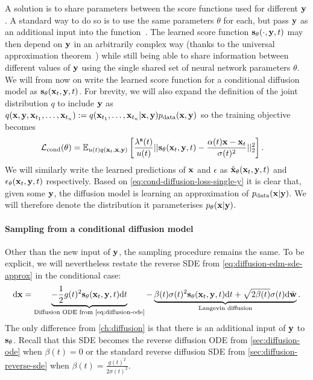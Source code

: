 A solution is to share parameters between the score functions used for different ${\mathbf{y}}$. A standard way to do so is to use the same parameters $\theta$ for each, but pass ${\mathbf{y}}$ as an additional input into the function~\citep{sohn2015learning}. The learned score function ${\mathbf{s}}_\theta(\cdot, {\mathbf{y}}, t)$ may then depend on ${\mathbf{y}}$ in an arbitrarily complex way (thanks to the universal approximation theorem~\citep{hornik1989multilayer}) while still being able to share information between different values of ${\mathbf{y}}$ using the single shared set of neural network parameters $\theta$. We will from now on write the learned score function for a conditional diffusion model as ${\mathbf{s}}_\theta({\mathbf{x}}_t, {\mathbf{y}}, t)$. For brevity, we will also expand the definition of the joint distribution $q$ to include ${\mathbf{y}}$ as $q({\mathbf{x}},{\mathbf{y}},{\mathbf{x}}_{t_1},\ldots,{\mathbf{x}}_{t_n}) := q({\mathbf{x}}_{t_1},\ldots,{\mathbf{x}}_{t_n}|{\mathbf{x}},{\mathbf{y}})p_{\rm{data}}({\mathbf{x}},{\mathbf{y}})$ so the training objective becomes
\begin{align} \label{eq:cond-diffusion-loss}
    {\mathcal{L}}_\text{cond}(\theta) &= \mathbb{E}_{u(t)q({\mathbf{x}}_t, {\mathbf{x}}, {\mathbf{y}})} \left[ \frac{\lambda^{\mathbf{s}}(t)}{u(t)} 
    || {\mathbf{s}}_{\theta}({\mathbf{x}}_t, {\mathbf{y}}, t) - \frac{\alpha(t){\mathbf{x}}-{\mathbf{x}}_t}{\sigma(t)^2} ||_2^2 \right].
\end{align}
We will similarly write the learned predictions of ${\mathbf{x}}$ and $\epsilon$ as $\hat{{\mathbf{x}}}_{\theta}({\mathbf{x}}_t, {\mathbf{y}}, t)$ and $\mathbf{\epsilon}_{\theta}({\mathbf{x}}_t, {\mathbf{y}}, t)$ respectively.
Based on \cref{eq:cond-diffusion-loss-single-y} it is clear that, given some ${\mathbf{y}}$, the diffusion model is learning an approximation of $p_{\rm{data}}({\mathbf{x}}|{\mathbf{y}})$. We will therefore denote the distribution it parameterises $p_\theta({\mathbf{x}}|{\mathbf{y}})$.

\paragraph{Sampling from a conditional diffusion model}
Other than the new input of ${\mathbf{y}}$, the sampling procedure remains the same. To be explicit, we will nevertheless restate the reverse SDE from \cref{eq:diffusion-edm-sde-approx} in the conditional case:
\begin{align}
    \mathrm{d}\rvx = \underbrace{- \frac{1}{2} g(t)^2 \rvs_\theta(\rvx_t, \rvy, t) \mathrm{d}t}_\text{Diffusion ODE from \cref{eq:diffusion-ode}} - \underbrace{\beta(t) \sigma(t)^2 \rvs_\theta(\rvx_t, \rvy, t) \mathrm{d}t + \sqrt{2\beta(t)}\sigma(t)\mathrm{d}\bar{\rvw}}_\text{Langevin diffusion}.
\end{align}
The only difference from \cref{ch:diffusion} is that there is an additional input of ${\mathbf{y}}$ to ${\mathbf{s}}_\theta$. Recall that this SDE becomes the reverse diffusion ODE from \cref{sec:diffusion-ode} when $\beta(t) = 0$ or the standard reverse diffusion SDE from \cref{sec:diffusion-reverse-sde} when $\beta(t) = \frac{g(t)^2}{2 \sigma(t)^2}$.

